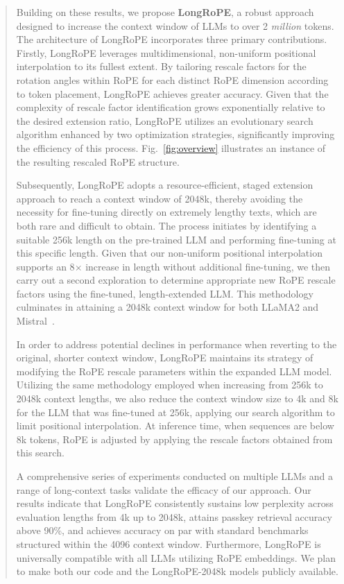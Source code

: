 \begin{abstract}
Building on these results, we propose \textbf{LongRoPE}, a robust approach designed to increase the context window of LLMs to over 2 \emph{million} tokens. The architecture of LongRoPE incorporates three primary contributions. Firstly, {LongRoPE} leverages multidimensional, non-uniform positional interpolation to its fullest extent. By tailoring rescale factors for the rotation angles within RoPE for each distinct RoPE dimension according to token placement, LongRoPE achieves greater accuracy. Given that the complexity of rescale factor identification grows exponentially relative to the desired extension ratio, {LongRoPE} utilizes an evolutionary search algorithm enhanced by two optimization strategies, significantly improving the efficiency of this process. Fig.~\ref{fig:overview} illustrates an instance of the resulting rescaled RoPE structure.

Subsequently, {LongRoPE} adopts a resource-efficient, staged extension approach to reach a context window of 2048k, thereby avoiding the necessity for fine-tuning directly on extremely lengthy texts, which are both rare and difficult to obtain. The process initiates by identifying a suitable 256k length on the pre-trained LLM and performing fine-tuning at this specific length. Given that our non-uniform positional interpolation supports an 8$\times$ increase in length without additional fine-tuning, we then carry out a second exploration to determine appropriate new RoPE rescale factors using the fine-tuned, length-extended LLM. This methodology culminates in attaining a 2048k context window for both LLaMA2 and Mistral~\cite{mistral}.

In order to address potential declines in performance when reverting to the original, shorter context window, {LongRoPE} maintains its strategy of modifying the RoPE rescale parameters within the expanded LLM model. Utilizing the same methodology employed when increasing from 256k to 2048k context lengths, we also reduce the context window size to 4k and 8k for the LLM that was fine-tuned at 256k, applying our search algorithm to limit positional interpolation. At inference time, when sequences are below 8k tokens, RoPE is adjusted by applying the rescale factors obtained from this search.

A comprehensive series of experiments conducted on multiple LLMs and a range of long-context tasks validate the efficacy of our approach. Our results indicate that LongRoPE consistently sustains low perplexity across evaluation lengths from 4k up to 2048k, attains passkey retrieval accuracy above 90\%, and achieves accuracy on par with standard benchmarks structured within the 4096 context window. Furthermore, LongRoPE is universally compatible with all LLMs utilizing RoPE embeddings. We plan to make both our code and the LongRoPE-2048k models publicly available.


\end{abstract}

